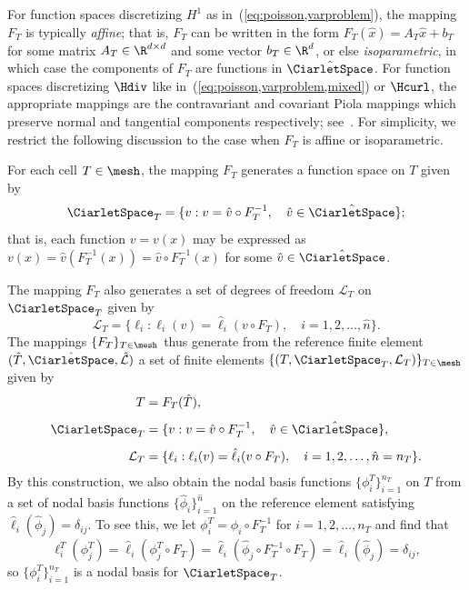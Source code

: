 %
For function spaces discretizing $H^1$ as
in~(\ref{eq:poisson,varproblem}), the mapping $F_T$ is typically
\emph{affine}; that is, $F_T$ can be written in the form $F_T(\hat{x})
= A_T \hat{x} + b_T$ for some matrix $A_T \in \R^{d\times d}$ and some
vector $b_T \in \R^d$, or else \emph{isoparametric}, in which case the
components of $F_T$ are functions in $\hat{\CiarletSpace}$. For function
spaces discretizing $\Hdiv$ like
in~(\ref{eq:poisson,varproblem,mixed}) or $\Hcurl$, the appropriate
mappings are the contravariant and covariant Piola mappings which
preserve normal and tangential components respectively;
see~\citet{RognesKirbyLogg2009}. For simplicity, we restrict the
following discussion to the case when $F_T$ is affine or
isoparametric.

For each cell $T \in \mesh$, the mapping $F_T$ generates a
function space on $T$ given by
\begin{equation}
  \CiarletSpace_T = \{ v : v = \hat{v} \circ F_T^{-1}, \quad \hat{v} \in
  \hat{\CiarletSpace} \};
\end{equation}
that is, each function $v = v(x)$ may be expressed as $v(x) =
\hat{v}(F_T^{-1}(x)) = \hat{v} \circ F_T^{-1} (x)$ for some $\hat{v}
\in \hat{\CiarletSpace}$.

The mapping $F_T$ also generates a set of degrees of freedom
$\mathcal{L}_T$ on $\CiarletSpace_T$ given by
\begin{equation}
  \mathcal{L}_T = \{ \ell_i : \ell_i(v) = \hat{\ell}_i(v \circ
  F_T), \quad i=1,2,\ldots,\hat{n} \}.
\end{equation}
The mappings $\{F_T\}_{T\in\mesh}$ thus generate from the reference
finite element~$(\hat{T},\hat{\CiarletSpace},\hat{\mathcal{L}})$ a set
of finite elements $\{(T,\CiarletSpace_T,\mathcal{L}_T)\}_{T\in\mesh}$
given by
\begin{equation} \label{eq:elementgeneration}
  \begin{split}
  T &= F_T(\hat{T}), \\[1ex]
  \CiarletSpace_T &= \{ v : v = \hat{v} \circ F_T^{-1}, \quad \hat{v} \in \hat{\CiarletSpace} \}, \\[1ex]
  \mathcal{L}_T &= \{ \ell_i : \ell_i(v) = \hat{\ell}_i(v \circ F_T),
  \quad i=1,2,\ldots,\hat{n} = n_T \}.
  \end{split}
\end{equation}
By this construction, we also obtain the nodal basis functions
$\{\phi^T_i\}_{i=1}^{n_T}$ on $T$ from a set of nodal basis functions
$\{\hat{\phi}_i\}_{i=1}^{\hat{n}}$ on the reference element satisfying
$\hat{\ell}_i(\hat{\phi}_j) = \delta_{ij}$. To see this, we let
$\phi^T_i = \hat{\phi}_i \circ F_T^{-1}$ for $i=1,2,\ldots,n_T$ and
find that
\begin{equation}
  \ell^T_i(\phi^T_j)
  = \hat{\ell}_i(\phi^T_j \circ F_T)
  = \hat{\ell}_i(\hat{\phi}_j \circ F_T^{-1} \circ F_T)
  = \hat{\ell}_i(\hat{\phi}_j)
  = \delta_{ij},
\end{equation}
so $\{\phi^T_i\}_{i=1}^{n_T}$ is a nodal basis for $\CiarletSpace_T$.

